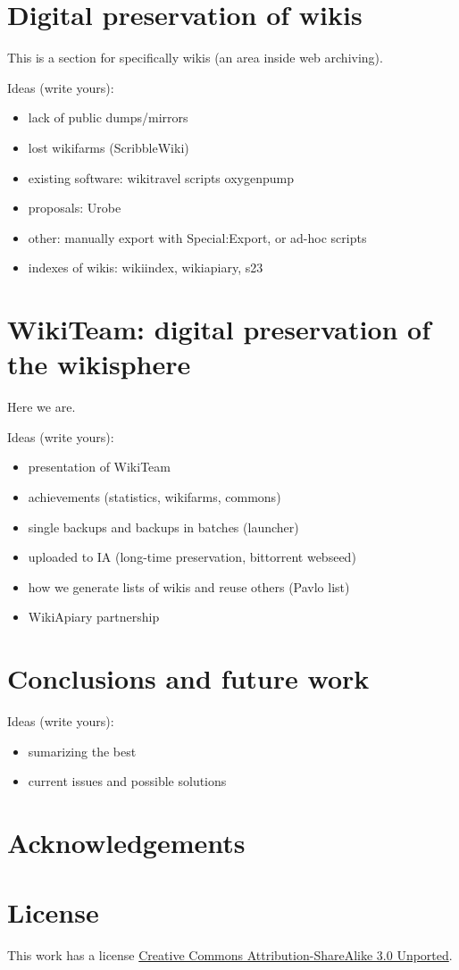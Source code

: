 \documentclass[11pt,twocolumn]{article}
\begin{document}
\section{Digital preservation of wikis}

This is a section for specifically wikis (an area inside web archiving).

Ideas (write yours):
\begin{itemize}
\item lack of public dumps/mirrors
\item lost wikifarms (ScribbleWiki)
\item existing software: wikitravel scripts oxygenpump %
\item proposals: Urobe
\item other: manually export with Special:Export, or ad-hoc scripts
\item indexes of wikis: wikiindex, wikiapiary, s23
\end{itemize}



\section{WikiTeam: digital preservation of the wikisphere}

Here we are.

Ideas (write yours):
\begin{itemize}
\item presentation of WikiTeam
\item achievements (statistics, wikifarms, commons)
\item single backups and backups in batches (launcher)
\item uploaded to IA (long-time preservation, bittorrent webseed)
\item how we generate lists of wikis and reuse others (Pavlo list)
\item WikiApiary partnership
\end{itemize}


\section{Conclusions and future work}

Ideas (write yours):
\begin{itemize}
\item sumarizing the best
\item current issues and possible solutions
\end{itemize}





\section*{Acknowledgements}


\section*{License}
This work has a license \href{http://creativecommons.org/licenses/by-sa/3.0/}{Creative Commons Attribution-ShareAlike 3.0 Unported}.
\end{document}
